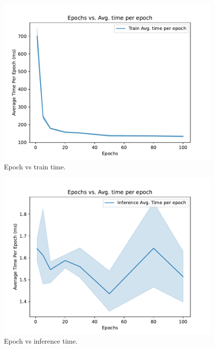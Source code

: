 \documentclass[sigplan,screen]{acmart}
\begin{document}
\begin{figure}[htb]
\centering\includegraphics[width=1.0\columnwidth]{images/epoch_vs_train_time.pdf}
\caption{Epoch vs train time.}
\label{fig:epochs_vs_accuracy}
\end{figure}

\begin{figure}[htb]
\centering\includegraphics[width=1.0\columnwidth]{images/epoch_vs_test_time.pdf}
\caption{Epoch vs inference time.}
\label{fig:epochs_vs_accuracy}
\end{figure}
\end{document}
